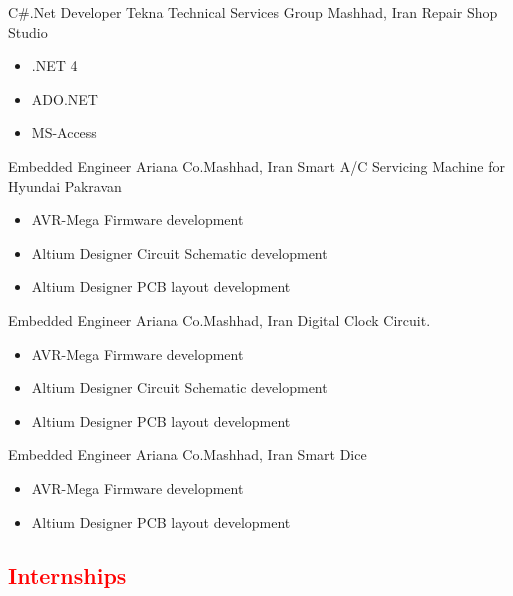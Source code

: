 	{C\#.Net Developer}
	{Tekna Technical Services Group}
        {Mashhad, Iran}
	{ \newline
         Repair Shop Studio
        }
        {
        \begin{itemize}
           \item .NET 4
           \item ADO.NET 
           \item MS-Access
        \end{itemize}
        }


	{Embedded Engineer}
	{Ariana Co.}{Mashhad, Iran}
	{
         \newline
        Smart A/C Servicing Machine for Hyundai Pakravan
        }
        {\begin{itemize}
            \item AVR-Mega Firmware development
            \item Altium Designer Circuit Schematic development
            \item Altium Designer  PCB layout development 
        \end{itemize}}


	{Embedded Engineer}
	{Ariana Co.}{Mashhad, Iran}
	{
        \newline 
        Digital Clock Circuit.
        }
        {
        \begin{itemize}
            \item AVR-Mega Firmware development
            \item Altium Designer Circuit Schematic development
            \item Altium Designer  PCB layout development 
        \end{itemize}
        }

	{Embedded Engineer}
	{Ariana Co.}{Mashhad, Iran}
	{
        \newline 
        Smart Dice
        }
        {
        \begin{itemize}
            \item AVR-Mega Firmware development
            \item Altium Designer  PCB layout development 
        \end{itemize}
        }


 


\vspace{2mm}
\subsection{\Large{\textcolor{red}{Internships}}}


